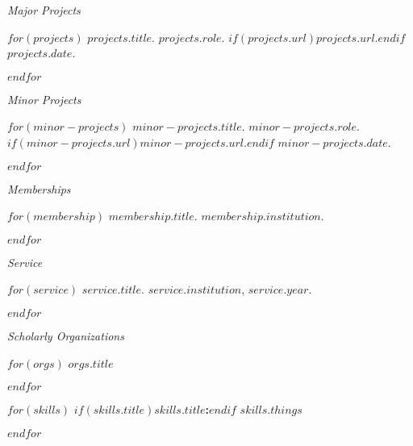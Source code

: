 \documentclass[11pt,article,oneside]{memoir}
\begin{document}
\bigskip
\pagebreak[1]


\ind \emph{Major Projects}

\smallskip

$for(projects)$
\ind \emph{$projects.title$}. $projects.role$. $if(projects.url)$\href{$projects.url$}{$projects.url$}.$endif$ $projects.date$.

\smallskip
$endfor$

\bigskip

\ind \emph{Minor Projects}

\smallskip

$for(minor-projects)$
\ind \emph{$minor-projects.title$}. $minor-projects.role$. $if(minor-projects.url)$\href{$minor-projects.url$}{$minor-projects.url$}.$endif$ $minor-projects.date$.

\smallskip
$endfor$

\bigskip
\pagebreak[1]


\ind \emph{Memberships}

\smallskip

$for(membership)$
\ind $membership.title$. $membership.institution$.

\smallskip

$endfor$

\medskip

\ind \emph{Service}

\smallskip

$for(service)$
\ind $service.title$. $service.institution$, $service.year$.

\smallskip

$endfor$

\medskip

\ind \emph{Scholarly Organizations}

\smallskip

$for(orgs)$
\ind $orgs.title$

\pagebreak[1]
$endfor$

\medskip

\bigskip


$for(skills)$
\ind$if(skills.title)$\textbf{$skills.title$:}$endif$ $skills.things$

\smallskip
\pagebreak[1]
$endfor$

\bigskip

\thispagestyle{jtmcolophon}
\end{document}
